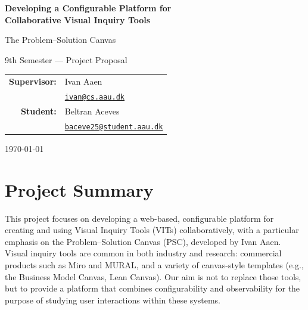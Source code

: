\documentclass[11pt,a4paper]{article}
\begin{document}
\begin{titlepage}
  \centering
  \vspace*{2cm}

  {\Huge\bfseries Developing a Configurable Platform for\\[0.4em] Collaborative Visual Inquiry Tools\par}
  \vspace{0.8cm}
  {\LARGE The Problem--Solution Canvas\par}

  \vspace{3cm}

  {\large 9th Semester --- Project Proposal\par}

  \vspace{2cm}

  \begin{tabular}{rl}
    \textbf{Supervisor:} & Ivan Aaen \\
                         & \href{mailto:ivan@cs.aau.dk}{\texttt{ivan@cs.aau.dk}} \\[0.8em]
    \textbf{Student:}    & Beltran Aceves \\
                         & \href{mailto:baceve25@student.aau.dk}{\texttt{baceve25@student.aau.dk}} \\
  \end{tabular}

  \vfill

  {\large \today\par}

  \vspace*{1cm}
\end{titlepage}

\tableofcontents
\newpage

\section{Project Summary}

This project focuses on developing a web-based, configurable platform for creating and using Visual Inquiry Tools (VITs) collaboratively, with a particular emphasis on the Problem--Solution Canvas (PSC), developed by Ivan Aaen. Visual inquiry tools are common in both industry and research: commercial products such as Miro and MURAL, and a variety of canvas-style templates (e.g., the Business Model Canvas, Lean Canvas). Our aim is not to replace those tools, but to provide a platform that combines configurability and observability for the purpose of studying user interactions within these systems.
\end{document}

